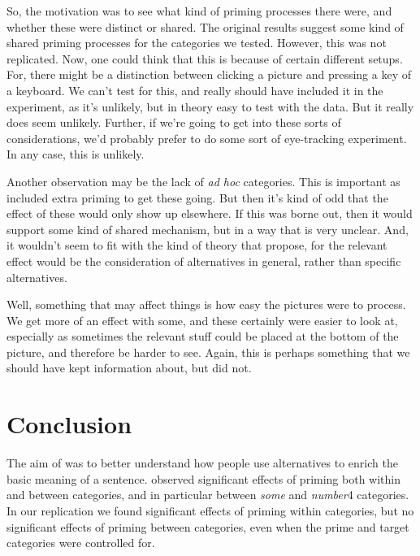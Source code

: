 \documentclass[10pt]{article}
\begin{document}
\begin{multicols}{2}
{\color{red} So, the motivation was to see what kind of priming processes there were, and whether these were distinct or shared.
  The original results suggest some kind of shared priming processes for the categories we tested.
  However, this was not replicated.
  Now, one could think that this is because of certain different setups.
  For, there might be a distinction between clicking a picture and pressing a key of a keyboard.
  We can't test for this, and really should have included it in the experiment, as it's unlikely, but in theory easy to test with the data.
  But it really does seem unlikely.
  Further, if we're going to get into these sorts of considerations, we'd probably prefer to do some sort of eye-tracking experiment.
  In any case, this is unlikely.

  Another observation may be the lack of \emph{ad hoc} categories.
  This is important as \citeauthor{Bott:2016aa} included extra priming to get these going.
  But then it's kind of odd that the effect of these would only show up elsewhere.
  If this was borne out, then it would support some kind of shared mechanism, but in a way that is very unclear.
  And, it wouldn't seem to fit with the kind of theory that \citeauthor{Bott:2016aa} propose, for the relevant effect would be the consideration of alternatives in general, rather than specific alternatives.

  Well, something that may affect things is how easy the pictures were to process.
  We get more of an effect with some, and these certainly were easier to look at, especially as sometimes the relevant stuff could be placed at the bottom of the picture, and therefore be harder to see.
  Again, this is perhaps something that we should have kept information about, but did not.
}




\section{Conclusion}
\label{sec:conclusion}

The aim of \textcite{Bott:2016aa} was to better understand how people use alternatives to enrich the basic meaning of a sentence.
\citeauthor{Bott:2016aa} observed significant effects of priming both within and between categories, and in particular between \emph{some} and \emph{number}4 categories.
In our replication we found significant effects of priming within categories, but no significant effects of priming between categories, even when the prime and target categories were controlled for.


\end{multicols}
\end{document}
